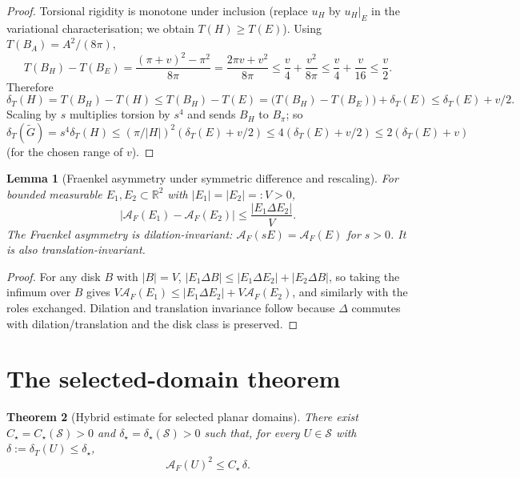 \documentclass[11pt]{amsart}
\newtheorem{theorem}{Theorem}[section]
\newtheorem{lemma}[theorem]{Lemma}
\newcommand{\R}{\mathbb R}
\newcommand{\dT}{\delta_T}
\newcommand{\AF}{\mathcal A_F}
\newcommand{\Gtil}{\widetilde G}
\newcommand{\Sclass}{\mathcal S}
\begin{document}
\begin{proof}
Torsional rigidity is monotone under inclusion (replace \(u_H\) by
\(u_H|_E\) in the variational characterisation; we obtain
\(T(H)\ge T(E)\)).  Using \(T(B_A)=A^2/(8\pi)\),
\[
   T(B_H)-T(B_E)=\frac{(\pi+v)^2-\pi^2}{8\pi}
      =\frac{2\pi v+v^2}{8\pi}\le\frac{v}{4}+\frac{v^2}{8\pi}
      \le\frac{v}{4}+\frac{v}{16}\le\frac{v}{2}.
\]
Therefore
\[
   \dT(H)=T(B_H)-T(H)\le T(B_H)-T(E)
      =\bigl(T(B_H)-T(B_E)\bigr)+\dT(E)\le\dT(E)+v/2.
\]
Scaling by \(s\) multiplies torsion by \(s^4\) and sends \(B_H\) to
\(B_\pi\); so \(\dT(\Gtil)=s^4\dT(H)\le(\pi/|H|)^2(\dT(E)+v/2)\le
4(\dT(E)+v/2)\le 2(\dT(E)+v)\) (for the chosen range of \(v\)).
\end{proof}

\begin{lemma}[Fraenkel asymmetry under symmetric difference and
rescaling]\label{lem:AF-lip}
For bounded measurable \(E_1,E_2\subset\R^2\) with
\(|E_1|=|E_2|=:V>0\),
\begin{equation}\label{eq:AF-lip}
   |\AF(E_1)-\AF(E_2)|\le\frac{|E_1\Delta E_2|}{V}.
\end{equation}
The Fraenkel asymmetry is dilation-invariant: \(\AF(sE)=\AF(E)\) for
\(s>0\).  It is also translation-invariant.
\end{lemma}

\begin{proof}
For any disk \(B\) with \(|B|=V\), \(|E_1\Delta B|\le|E_1\Delta E_2|
+|E_2\Delta B|\), so taking the infimum over \(B\) gives
\(V\AF(E_1)\le |E_1\Delta E_2|+V\AF(E_2)\), and similarly with the
roles exchanged.  Dilation and translation invariance follow
because \(\Delta\) commutes with dilation/translation and the disk
class is preserved.
\end{proof}

\section{The selected-domain theorem}\label{sec:selected-domain}

\begin{theorem}[Hybrid estimate for selected planar domains]
\label{thm:selected}
There exist \(C_\star=C_\star(\Sclass)>0\) and
\(\delta_\star=\delta_\star(\Sclass)>0\) such that, for every
\(U\in\Sclass\) with \(\delta:=\dT(U)\le\delta_\star\),
\begin{equation}\label{eq:selected-final}
   \AF(U)^2\le C_\star\,\delta.
\end{equation}
\end{theorem}
\end{document}
